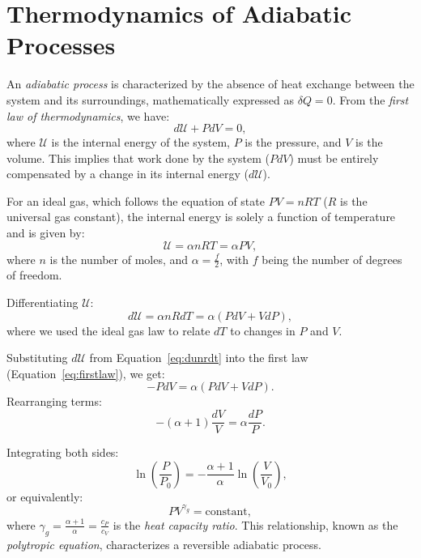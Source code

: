 \section{Thermodynamics of Adiabatic Processes}
\label{app:thermo}

An \emph{adiabatic process} is characterized by the absence of heat exchange between the system and its surroundings, mathematically expressed as \( \delta Q = 0 \). From the \emph{first law of thermodynamics}, we have:
\begin{equation}
\label{eq:firstlaw}
d\mathcal{U} + P dV = 0,
\end{equation}
where \( \mathcal{U} \) is the internal energy of the system, \( P \) is the pressure, and \( V \) is the volume. This implies that work done by the system (\( P dV \)) must be entirely compensated by a change in its internal energy (\( d\mathcal{U} \)).

For an ideal gas, which follows the equation of state \( P V = n R T \) (\( R \) is the universal gas constant), the internal energy is solely a function of temperature and is given by:
\begin{equation}
\label{eq:nrt}
\mathcal{U} = \alpha n R T = \alpha P V,
\end{equation}
where \( n \) is the number of moles, and \( \alpha = \frac{f}{2} \), with \( f \) being the number of degrees of freedom.

Differentiating \( \mathcal{U} \):
\begin{equation}
\label{eq:dunrdt}
d\mathcal{U} = \alpha n R dT = \alpha (P dV + V dP),
\end{equation}
where we used the ideal gas law to relate \( dT \) to changes in \( P \) and \( V \).

Substituting \( d\mathcal{U} \) from Equation~\ref{eq:dunrdt} into the first law (Equation~\ref{eq:firstlaw}), we get:
\begin{equation}
- P dV = \alpha (P dV + V dP).
\end{equation}
Rearranging terms:
\begin{equation}
-(\alpha + 1) \frac{dV}{V} = \alpha \frac{dP}{P}.
\end{equation}

Integrating both sides:
\begin{equation}
\ln \left( \frac{P}{P_0} \right) = - \frac{\alpha + 1}{\alpha} \ln \left( \frac{V}{V_0} \right),
\end{equation}
or equivalently:
\begin{equation}
P V^{\gamma_g} = \text{constant},
\end{equation}
where \( \gamma_g = \frac{\alpha + 1}{\alpha} = \frac{c_P}{c_V} \) is the \emph{heat capacity ratio}. 
%
This relationship, known as the \emph{polytropic equation}, characterizes a reversible adiabatic process.



